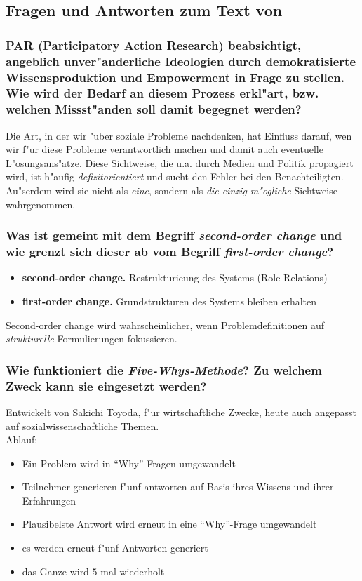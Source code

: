 \subsection{Fragen und Antworten zum Text von \textcite{kohfeldt_five_2012-1}}
\subsubsection{PAR (Participatory Action Research) beabsichtigt, angeblich unver"anderliche Ideologien durch demokratisierte Wissensproduktion und Empowerment in Frage zu stellen. Wie wird der Bedarf an diesem Prozess erkl"art, bzw. welchen Missst"anden soll damit begegnet werden?}
Die Art, in der wir "uber soziale Probleme nachdenken, hat Einfluss darauf, wen wir f"ur diese Probleme verantwortlich machen und damit auch eventuelle L"osungsans"atze. Diese Sichtweise, die u.a. durch Medien und Politik propagiert wird, ist h"aufig \emph{defizitorientiert} und sucht den Fehler bei den Benachteiligten. Au"serdem wird sie nicht als \emph{eine}, sondern als \emph{die einzig m"ogliche} Sichtweise wahrgenommen.

\subsubsection{Was ist gemeint mit dem Begriff \emph{second-order change} und wie grenzt sich dieser ab vom Begriff \emph{first-order change}?}
\begin{itemize}
        \item \textbf{second-order change.} Restrukturieung des Systems (Role Relations)
        \item \textbf{first-order change.} Grundstrukturen des Systems bleiben erhalten
\end{itemize}

Second-order change wird wahrscheinlicher, wenn Problemdefinitionen auf \emph{strukturelle} Formulierungen fokussieren.

\subsubsection{Wie funktioniert die \emph{Five-Whys-Methode}? Zu welchem Zweck kann sie eingesetzt werden?}
Entwickelt von Sakichi Toyoda, f"ur wirtschaftliche Zwecke, heute auch angepasst auf sozialwissenschaftliche Themen.\\
Ablauf:
\begin{itemize}
        \item Ein Problem wird in ``Why''-Fragen umgewandelt
        \item Teilnehmer generieren f"unf antworten auf Basis ihres Wissens und ihrer Erfahrungen
        \item Plausibelste Antwort wird erneut in eine ``Why''-Frage umgewandelt
        \item es werden erneut f"unf Antworten generiert
        \item das Ganze wird $5$-mal wiederholt
\end{itemize}


